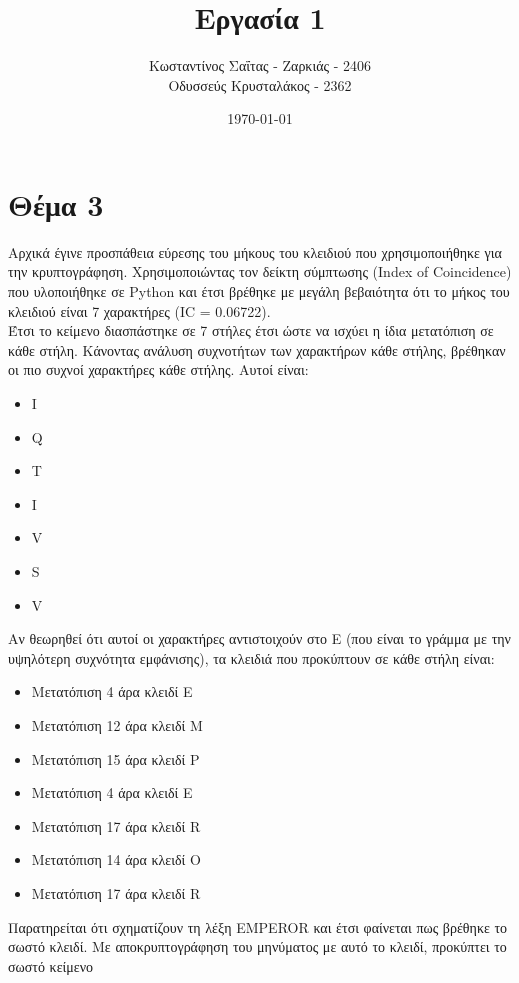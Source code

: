\documentclass[a4paper, 11pt]{article}
\title{Εργασία 1}
\author{Κωσταντίνος Σαΐτας - Ζαρκιάς - 2406 \\ Οδυσσεύς Κρυσταλάκος - 2362}
\date{\today}
\newcommand{\lt}{\latintext}
\begin{document}
\maketitle

\section*{Θέμα 3}
Αρχικά έγινε προσπάθεια εύρεσης του μήκους του κλειδιού που χρησιμοποιήθηκε για την κρυπτογράφηση.
Χρησιμοποιώντας τον δείκτη σύμπτωσης ({\lt Index of Coincidence}) που υλοποιήθηκε σε {\lt Python} και έτσι βρέθηκε
με μεγάλη βεβαιότητα ότι το μήκος του κλειδιού είναι 7 χαρακτήρες ({\lt IC} = 0.06722).
\\
Έτσι το κείμενο διασπάστηκε σε 7 στήλες έτσι ώστε να ισχύει η ίδια μετατόπιση σε κάθε στήλη. Κάνοντας ανάλυση συχνοτήτων
των χαρακτήρων κάθε στήλης, βρέθηκαν οι πιο συχνοί χαρακτήρες κάθε στήλης. Αυτοί είναι:

{\lt
\begin{itemize}
	\item I
	\item Q
	\item T
	\item I
	\item V
	\item S
	\item V
\end{itemize}
}

Αν θεωρηθεί ότι αυτοί οι χαρακτήρες αντιστοιχούν στο {\lt E} (που είναι το γράμμα με την υψηλότερη συχνότητα εμφάνισης), τα
κλειδιά που προκύπτουν σε κάθε στήλη είναι:

\begin{itemize}
	\item Μετατόπιση 4 άρα κλειδί {\lt E}
	\item Μετατόπιση 12 άρα κλειδί {\lt M}
	\item Μετατόπιση 15 άρα κλειδί {\lt P}
	\item Μετατόπιση 4 άρα κλειδί {\lt E}
	\item Μετατόπιση 17 άρα κλειδί {\lt R}
	\item Μετατόπιση 14 άρα κλειδί {\lt O}
	\item Μετατόπιση 17 άρα κλειδί {\lt R}
\end{itemize}

Παρατηρείται ότι σχηματίζουν τη λέξη {\lt EMPEROR} και έτσι φαίνεται πως βρέθηκε το σωστό κλειδί. Με αποκρυπτογράφηση του
μηνύματος με αυτό το κλειδί, προκύπτει το σωστό κείμενο
\end{document}
